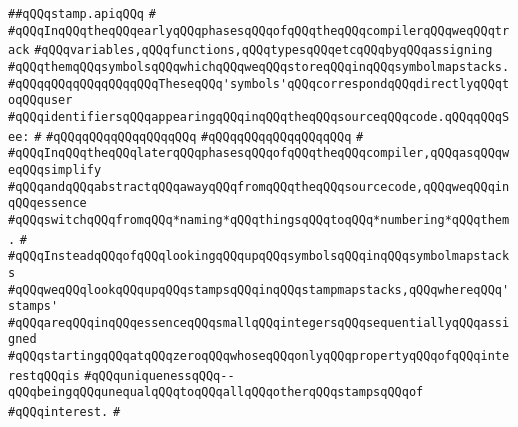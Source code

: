 \label{src/lib/compiler/front/typer-stuff/basics/stamp.api}
\verb|##qQQqstamp.apiqQQq|\newline
\verb|#|\newline
\verb|#qQQqInqQQqtheqQQqearlyqQQqphasesqQQqofqQQqtheqQQqcompilerqQQqweqQQqtrack|\newline
\verb|#qQQqvariables,qQQqfunctions,qQQqtypesqQQqetcqQQqbyqQQqassigning|\newline
\verb|#qQQqthemqQQqsymbolsqQQqwhichqQQqweqQQqstoreqQQqinqQQqsymbolmapstacks.|\newline
\verb|#qQQqqQQqqQQqqQQqqQQqTheseqQQq'symbols'qQQqcorrespondqQQqdirectlyqQQqtoqQQquser|\newline
\verb|#qQQqidentifiersqQQqappearingqQQqinqQQqtheqQQqsourceqQQqcode.qQQqqQQqSee:|\newline
\verb|#|\newline
\verb|#qQQqqQQqqQQqqQQqqQQq|\newline
\verb|#qQQqqQQqqQQqqQQqqQQq|\newline
\verb|#|\newline
\verb|#qQQqInqQQqtheqQQqlaterqQQqphasesqQQqofqQQqtheqQQqcompiler,qQQqasqQQqweqQQqsimplify|\newline
\verb|#qQQqandqQQqabstractqQQqawayqQQqfromqQQqtheqQQqsourcecode,qQQqweqQQqinqQQqessence|\newline
\verb|#qQQqswitchqQQqfromqQQq*naming*qQQqthingsqQQqtoqQQq*numbering*qQQqthem.|\newline
\verb|#|\newline
\verb|#qQQqInsteadqQQqofqQQqlookingqQQqupqQQqsymbolsqQQqinqQQqsymbolmapstacks|\newline
\verb|#qQQqweqQQqlookqQQqupqQQqstampsqQQqinqQQqstampmapstacks,qQQqwhereqQQq'stamps'|\newline
\verb|#qQQqareqQQqinqQQqessenceqQQqsmallqQQqintegersqQQqsequentiallyqQQqassigned|\newline
\verb|#qQQqstartingqQQqatqQQqzeroqQQqwhoseqQQqonlyqQQqpropertyqQQqofqQQqinterestqQQqis|\newline
\verb|#qQQquniquenessqQQq--qQQqbeingqQQqunequalqQQqtoqQQqallqQQqotherqQQqstampsqQQqof|\newline
\verb|#qQQqinterest.|\newline
\verb|#|\newline
